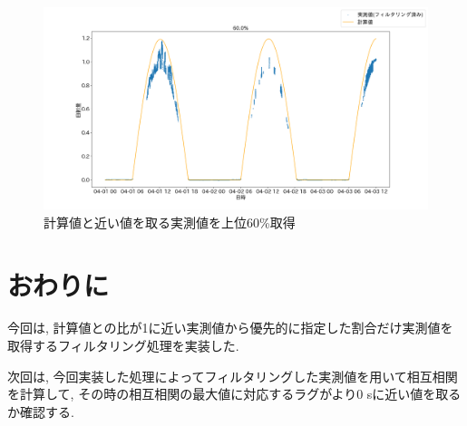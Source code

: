 \documentclass[a4j,12pt,]{jarticle}
\begin{document}
\begin{figure}[H]
  \begin{center}
    \includegraphics[width=160mm]{60.png}
    \caption{計算値と近い値を取る実測値を上位60\%取得}
    \label{p5}
  \end{center}
\end{figure}

\section{おわりに}
今回は, 計算値との比が1に近い実測値から優先的に指定した割合だけ実測値を取得するフィルタリング処理を実装した.

次回は, 今回実装した処理によってフィルタリングした実測値を用いて相互相関を計算して, その時の相互相関の最大値に対応するラグがより0 \si{\second}に近い値を取るか確認する.
\end{document}
